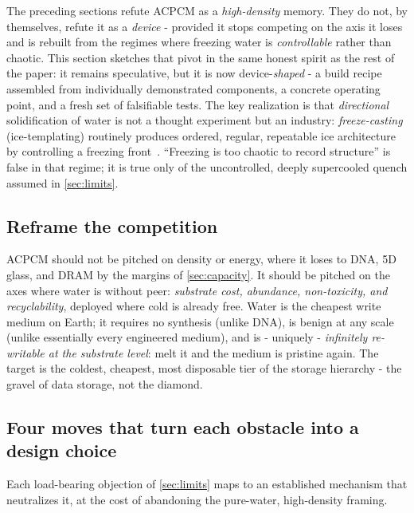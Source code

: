 \documentclass[11pt]{article}
\theoremstyle{definition}
\begin{document}
The preceding sections refute ACPCM as a \emph{high-density} memory. They do not, by
themselves, refute it as a \emph{device} - provided it stops competing on the axis it loses
and is rebuilt from the regimes where freezing water is \emph{controllable} rather than
chaotic. This section sketches that pivot in the same honest spirit as the rest of the paper:
it remains speculative, but it is now device-\emph{shaped} - a build recipe assembled from
individually demonstrated components, a concrete operating point, and a fresh set of
falsifiable tests. The key realization is that \emph{directional} solidification of water is
not a thought experiment but an industry: \emph{freeze-casting} (ice-templating) routinely
produces ordered, regular, repeatable ice architecture by controlling a freezing
front~\cite{deville2006freezecast}. ``Freezing is too chaotic to record structure'' is false
in that regime; it is true only of the uncontrolled, deeply supercooled quench assumed in
\cref{sec:limits}.

\subsection{Reframe the competition}
ACPCM should not be pitched on density or energy, where it loses to DNA, 5D glass, and DRAM
by the margins of \cref{sec:capacity}. It should be pitched on the axes where water is without
peer: \emph{substrate cost, abundance, non-toxicity, and recyclability}, deployed where cold
is already free. Water is the cheapest write medium on Earth; it requires no synthesis (unlike
DNA), is benign at any scale (unlike essentially every engineered medium), and is - uniquely -
\emph{infinitely re-writable at the substrate level}: melt it and the medium is pristine
again. The target is the coldest, cheapest, most disposable tier of the storage hierarchy -
the gravel of data storage, not the diamond.

\subsection{Four moves that turn each obstacle into a design choice}
Each load-bearing objection of \cref{sec:limits} maps to an established mechanism that
neutralizes it, at the cost of abandoning the pure-water, high-density framing.
\end{document}
